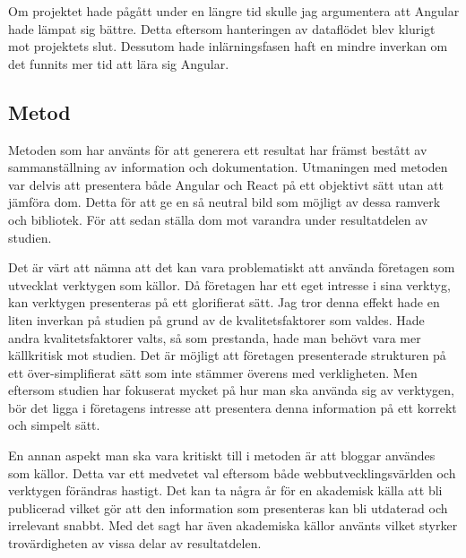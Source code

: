 Om projektet hade pågått under en längre tid skulle jag argumentera att Angular hade lämpat sig bättre. Detta eftersom hanteringen av dataflödet blev klurigt mot projektets slut. Dessutom hade inlärningsfasen haft en mindre inverkan om det funnits mer tid att lära sig Angular.

\subsection{Metod}
\label{subsec:axel-discussion-method}
Metoden som har använts för att generera ett resultat har främst bestått av sammanställning av information och dokumentation. Utmaningen med metoden var delvis att presentera både Angular och React på ett objektivt sätt utan att jämföra dom. Detta för att ge en så neutral bild som möjligt av dessa ramverk och bibliotek. För att sedan ställa dom mot varandra under resultatdelen av studien. 

Det är värt att nämna att det kan vara problematiskt att använda företagen som utvecklat verktygen som källor. Då företagen har ett eget intresse i sina verktyg, kan verktygen presenteras på ett glorifierat sätt. Jag tror denna effekt hade en liten inverkan på studien på grund av de kvalitetsfaktorer som valdes. Hade andra kvalitetsfaktorer valts, så som prestanda, hade man behövt vara mer källkritisk mot studien. Det är möjligt att företagen presenterade strukturen på ett över-simplifierat sätt som inte stämmer överens med verkligheten. Men eftersom studien har fokuserat mycket på hur man ska använda sig av verktygen, bör det ligga i företagens intresse att presentera denna information på ett korrekt och simpelt sätt. 

En annan aspekt man ska vara kritiskt till i metoden är att bloggar användes som källor. Detta var ett medvetet val eftersom både webbutvecklingsvärlden och verktygen förändras hastigt. Det kan ta några år för en akademisk källa att bli publicerad vilket gör att den information som presenteras kan bli utdaterad och irrelevant snabbt. Med det sagt har även akademiska källor använts vilket styrker trovärdigheten av vissa delar av resultatdelen.

\pagebreak

